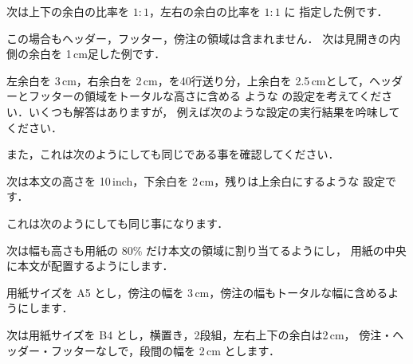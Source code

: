 次は上下の余白の比率を $1:1$，左右の余白の比率を $1:1$ に
指定した例です．


この場合もヘッダー，フッター，傍注の領域は含まれません．
次は見開きの内側の余白を 1\,cm足した例です．


左余白を 3\,cm，右余白を 2\,cm，を40行送り分，上余白を
2.5\,cmとして，ヘッダーとフッターの領域をトータルな高さに含める
ような  の設定を考えてください．いくつも解答はありますが，
例えば次のような設定の実行結果を吟味してください．

\begin{intext}
\geometry{left=3cm,right=2cm,lines=40,top=2.5cm,includeheadfoot}
\end{intext}

また，これは次のようにしても同じである事を確認してください．

\begin{intext}
\end{intext}


次は本文の高さを 10\,inch，下余白を 2\,cm，残りは上余白にするような
設定です．


これは次のようにしても同じ事になります．

\begin{intext}
\geometry{bottom=2cm,textheight=10in}
\end{intext}


次は幅も高さも用紙の 80\% だけ本文の領域に割り当てるようにし，
用紙の中央に本文が配置するようにします．


用紙サイズを A5 とし，傍注の幅を 3\,cm，傍注の幅もトータルな幅に含めるよ
うにします．


次は用紙サイズを B4 とし，横置き，2段組，左右上下の余白は2\,cm，
傍注・ヘッダー・フッターなしで，段間の幅を 2\,cm とします．

